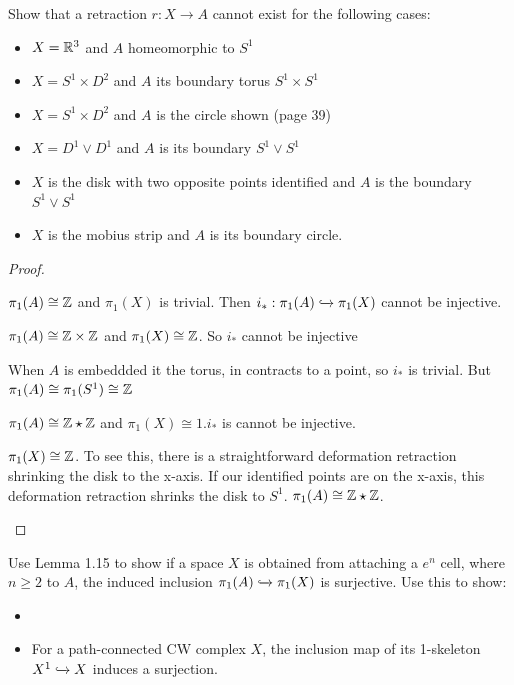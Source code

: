 \documentclass[10pt]{article}
\begin{document}
\begin{exercise}[1.1.16]
	Show that a retraction $r: X \to A$ cannot exist for the following cases:
	\begin{itemize}
		\item{$X=\mathbb{R}^3$ and $A$ homeomorphic to $S^1$}
		\item{$X=S^1\times D^2$ and $A$ its boundary torus $S^1\times S^1$}
		\item{$X=S^1\times D^2$ and $A$ is the circle shown (page 39)}
		\item{$X=D^1\vee D^1$ and $A$ is its boundary $S^1\vee S^1$}
		\item{$X$ is the disk with two opposite points identified and $A$ is the boundary $S^1\vee S^1$}
		\item{$X$ is the mobius strip and $A$ is its boundary circle.}
	\end{itemize}
\end{exercise}

\begin{proof}
	\begin{itemize}
		\item{$\pi_1(A) \cong \mathbb{Z}$ and $\pi_1(X)$ is trivial. Then $i_*: \pi_1(A) \xhookrightarrow{} \pi_1(X)$ cannot be injective.}
		\item{$\pi_1(A) \cong \mathbb{Z} \times \mathbb{Z}$ and $\pi_1(X) \cong \mathbb{Z}$. So $i_*$ cannot be injective}
		\item{When $A$ is embeddded it the torus, in contracts to a point, so $i_*$ is trivial. But $\pi_1(A) \cong \pi_1(S^1) \cong \mathbb{Z}$}
		\item{{$\pi_1(A) \cong \mathbb{Z} \star \mathbb{Z}$ and $\pi_1(X) \cong 1. $$i_*$ is cannot be injective.}
		\item{$\pi_1(X) \cong \mathbb{Z}$. To see this, there is a straightforward
			deformation retraction shrinking the disk to the x-axis. If our
		identified points are on the x-axis, this deformation retraction shrinks
	the disk to $S^1$. $\pi_1(A) \cong \mathbb{Z} \star \mathbb{Z}$.}
		\item{}}
	\end{itemize}
\end{proof}

\begin{exercise}[1.1.18]
	Use Lemma 1.15 to show if a space $X$ is obtained from attaching a $e^n$
	cell, where $n \geq 2$ to $A$, the induced inclusion $\pi_1(A) \xhookrightarrow{} \pi_1(X)$ is
	surjective. Use this to show:
	\begin{itemize}
		\item{}
		\item{For a path-connected CW complex $X$, the inclusion map of its
			1-skeleton $X^1 \xhookrightarrow{} X$ induces a surjection.}
	\end{itemize}
\end{exercise}
\end{document}

